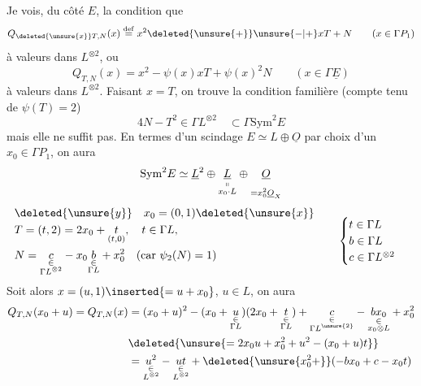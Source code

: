 
Je vois, du côté $E$, la condition que
\[
Q_{\deleted{\unsure{x}}T,N}(x)\overset{\mathrm{def}}=x^2\deleted{\unsure{+}}\unsure{-|+}xT+N\qquad(x\in\Gamma P_1)
\]
à valeurs dans $L^{\otimes2}$, ou 
\[
Q_{T,N}(x)=x^2-\psi(x)xT+\psi(x)^2N\qquad(x\in\Gamma\underline E)
\]
à valeurs dans $L^{\otimes2}$. Faisant $x=T$, on trouve la condition familière (compte tenu de $\psi(T)=2$)
\[
4N-T^2\in\Gamma L^{\otimes2}\quad\subset\Gamma\mathrm{Sym}^2 E
\]
mais elle ne suffit pas. En termes d'un scindage $E\simeq L\oplus\underline O$ par choix d'un $x_0\in\Gamma P_1$, on aura
\[
\mathrm{Sym}^2E\simeq\underline L^2\oplus\underset{\substack{\shortparallel\\x_0\cdot L}}{\underline L}\oplus\underset{\substack{\phantom{\shortparallel}\\=x_0^2\underline O_X}}{\underline O}
\]
\[
\begin{aligned}&\deleted{\unsure{y}}\quad x_0=(0,1)\deleted{\unsure{x}}\\ &T=(t,2)=2x_0+\underset{(t,0)}t,\quad t\in\Gamma L,\\ &N=\underset{\substack{\in\\\Gamma L^{\otimes2}}}c-x_0\underset{\substack{\in\\\Gamma L}}b+x_0^2\quad(\text{car }\psi_2(N)=1)\end{aligned}\qquad\begin{cases}t\in\Gamma L\\ b\in\Gamma L\\c\in\Gamma L^{\otimes2}\end{cases}
\]
Soit alors $x=(u,1)\inserted{=u+x_0}$, $u\in L$, on aura
\[
\begin{aligned}Q_{T,N}(x_0+u)=Q_{T,N}(x)&=(x_0+u)^2-(x_0+\underset{\substack{\in\\\Gamma L}}u)(2x_0+\underset{\substack{\in\\\Gamma L}}t)+\underset{\substack{\in\\\Gamma L^{\unsure{2}}}}c-\underset{\substack{\in\\x_0\otimes L}}{bx_0}+x_0^2\\ &\deleted{\unsure{=2x_0u+x_0^2+u^2-(x_0+u)t}}\\ &=\underset{\substack{\in\\L^{\otimes2}}}{u^2}-\underset{\substack{\in\\L^{\otimes2}}}{ut}+\deleted{\unsure{x_0^2+}}(-bx_0+c-x_0t)\end{aligned}
\]
